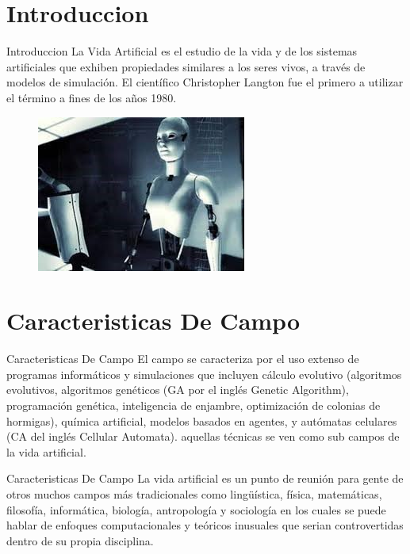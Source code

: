 \documentclass[11pt]{beamer}
\begin{document}
\section{Introduccion}
	\begin{frame}{Introduccion}
	\justify
	La Vida Artificial es el estudio de la vida y de los sistemas artificiales que exhiben propiedades 				similares a los seres vivos, a través de modelos de simulación. El científico Christopher Langton fue el 		primero a utilizar el término a fines de los años 1980.
		\begin{figure}
			\centering
			
			\includegraphics[scale=0.5]{robot.jpg}
			
		\end{figure}
	\end{frame}
\section{Caracteristicas De Campo}
	\begin{frame}{Caracteristicas De Campo}
		\justify
		El campo se caracteriza por el uso extenso de programas informáticos y simulaciones que incluyen cálculo evolutivo (algoritmos evolutivos, algoritmos genéticos (GA por el inglés Genetic Algorithm), programación genética, inteligencia de enjambre, optimización de colonias de hormigas), química artificial, modelos basados en agentes, y autómatas celulares (CA del inglés Cellular Automata). 
aquellas técnicas se ven como sub campos de la vida artificial. 

	\end{frame}
	
	\begin{frame}{Caracteristicas De Campo}
		\justify
		 La vida artificial es un punto de reunión para gente de otros muchos campos más tradicionales como lingüística, física, matemáticas, filosofía, informática, biología, antropología y sociología en los cuales se puede hablar de enfoques computacionales y teóricos inusuales que serian controvertidas dentro de su propia disciplina. 

	\end{frame}
\end{document}
